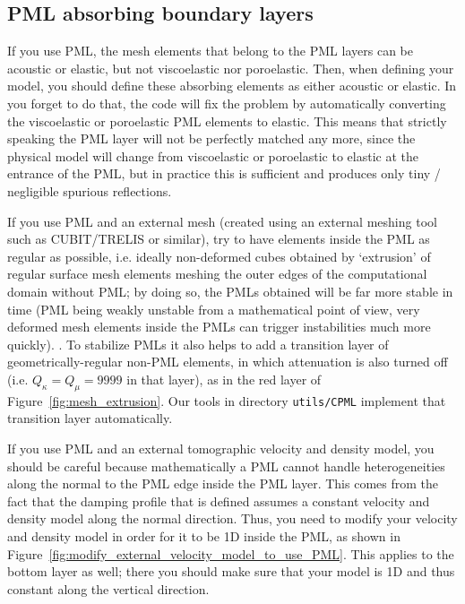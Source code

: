 \subsection{PML absorbing boundary layers}

If you use PML, the mesh elements that belong to the PML layers can
be acoustic or elastic, but not viscoelastic nor poroelastic. Then,
when defining your model, you should define these absorbing elements
as either acoustic or elastic. In you forget to do that, the code
will fix the problem by automatically converting the viscoelastic
or poroelastic PML elements to elastic. This means that strictly speaking
the PML layer will not be perfectly matched any more, since the physical
model will change from viscoelastic or poroelastic to elastic at the
entrance of the PML, but in practice this is sufficient and produces
only tiny / negligible spurious reflections.\newline


If you use PML and an external mesh (created using an external meshing tool
such as CUBIT/TRELIS or similar), try to have elements inside the PML as regular as possible,
i.e. ideally non-deformed cubes obtained by `extrusion' of regular surface mesh elements meshing the
outer edges of the computational domain without PML; by doing so, the PMLs obtained will be far more stable
in time (PML being weakly unstable from a mathematical point of view, very deformed mesh elements
inside the PMLs can trigger instabilities much more quickly). . To stabilize PMLs it also helps to add a transition layer of geometrically-regular non-PML elements, in which attenuation is also
turned off (i.e. $Q_\kappa = Q_\mu = 9999$ in that layer), as in the red layer of Figure~\ref{fig:mesh_extrusion}.
Our tools in directory \texttt{utils/CPML} implement that transition layer automatically.\newline


If you use PML and an external tomographic velocity and density model,
you should be careful because mathematically a PML cannot handle heterogeneities
along the normal to the PML edge inside the PML layer. This comes
from the fact that the damping profile that is defined assumes a constant
velocity and density model along the normal direction.
Thus, you need to modify your velocity and density model in order
for it to be 1D inside the PML, as shown in Figure~\ref{fig:modify_external_velocity_model_to_use_PML}.
This applies to the bottom layer as well; there you should make sure
that your model is 1D and thus constant along the vertical direction.\newline


